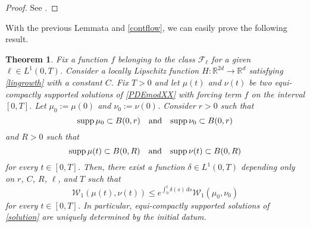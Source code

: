 \documentclass[11pt]{article}
\theoremstyle{plain}
\newtheorem{theorem}{Theorem}[section]
\theoremstyle{definition}
\theoremstyle{remark}
\numberwithin{equation}{section}
\newcommand{\R}{{\mathbb R}}
\newcommand{\WW}{{\mathcal W}_1}
\begin{document}
\begin{proof}
See \cite[Lemma 4.7]{CanCarRos10}.
\end{proof}


With the previous Lemmata and \eqref{contflow}, we can easily prove the following result.
\begin{theorem}\label{uniq}
Fix a function  $f$ belonging to the class ${\mathcal F}_\ell$ for a given $\ell \in L^1(0,T)$. Consider a locally Lipschitz function $H\colon \R^{2d} \to \R^{d}$ satisfying \eqref{lingrowth} with a constant $C$. Fix $T>0$  and let $\mu(t)$ and $\nu(t)$ be two equi-compactly supported solutions  of \eqref{PDEmodXX} with forcing term $f$ on the interval $[0, T]$. Let $\mu_0:=\mu(0)$ and $\nu_0:=\nu(0)$. Consider $r>0$ such that
$$
{\rm supp}\,\mu_0 \subset B(0, r)\quad\hbox{and}\quad {\rm supp}\,\nu_0 \subset B(0, r)
$$
and $R>0$ such that
\begin{equation}\label{supptot}
{\rm supp}\,\mu(t) \subset B(0, R)\quad\hbox{and}\quad {\rm supp}\,\nu(t) \subset B(0, R)
\end{equation}
for every $t \in[0, T]$. Then, there exist a function $\delta \in L^1(0,T)$ depending only on $r$, $C$, $R$,  $\ell$, and $T$ such that
\begin{equation}\label{stab}
\WW(\mu(t), \nu(t)) \le e^{\int_0^t \delta(s)\,ds} \WW(\mu_0, \nu_0)
\end{equation}
for every $t \in [0, T]$. In particular, equi-compactly supported solutions of \eqref{solution} are uniquely determined by the initial datum.
\end{theorem}
\end{document}
